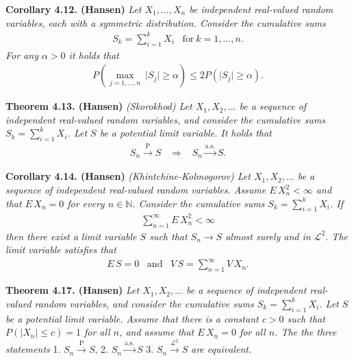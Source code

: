 \documentclass[
]{book}
\begin{document}
\textbf{Corollary 4.12. (Hansen)} \emph{Let \(X_1,...,X_n\) be independent real-valued random variables, each with a symmetric distribution. Consider the cumulative sums}
\begin{align*}
    S_k=\sum_{i=1}^kX_i\hspace{10pt}\text{for}\ k=1,..., n.
\end{align*}
\emph{For any \(\alpha>0\) it holds that}
\begin{align*}
    P\left(\max_{j=1,...,n}\ \vert S_j\vert\ge \alpha\right)\le 2 P(\vert S_j\vert\ge \alpha).\tag{4.14}
\end{align*}

\textbf{Theorem 4.13. (Hansen)} \emph{(Skorokhod) Let \(X_1,X_2,...\) be a sequence of independent real-valued random variables, and consider the cumulative sums \(S_k=\sum_{i=1}^kX_i\). Let \(S\) be a potential limit variable. It holds that}
\begin{align*}
    S_n \stackrel{\text{P}}{\to} S\hspace{10pt}\Rightarrow\hspace{10pt} S_n\stackrel{\text{a.s.}}{\to} S.
\end{align*}

\textbf{Corollary 4.14. (Hansen)} \emph{(Khintchine-Kolmogorov) Let \(X_1,X_2,...\) be a sequence of independent real-valued random variables. Assume \(E\, X_n^2<\infty\) and that \(E\, X_n=0\) for every \(n\in\mathbb{N}\). Consider the cumulative sums \(S_k=\sum_{i=1}^kX_i\). If}
\begin{align*}
    \sum_{n=1}^\infty E\, X_n^2<\infty\tag{4.18}
\end{align*}
\emph{then there exist a limit variable \(S\) such that \(S_n\to S\) almost surely and in \(\mathcal{L}^2\). The limit variable satisfies that}
\begin{align*}
    E\, S=0\hspace{10pt}\text{and}\hspace{10pt}V\, S=\sum_{n=1}^\infty V\, X_n.
\end{align*}

\textbf{Theorem 4.17. (Hansen)} \emph{Let \(X_1,X_2,...\) be a sequence of independent real-valued random variables, and consider the cumulative sums \(S_k=\sum_{i=1}^kX_i\). Let \(S\) be a potential limit variable. Assume that there is a constant \(c>0\) such that \(P(\vert X_n\vert \le c)=1\) for all \(n\), and assume that \(E\, X_n=0\) for all \(n\). The the three statements}
1. \(S_n\stackrel{\text{P}}{\to} S\),
2. \(S_n\stackrel{\text{a.s.}}{\to} S\)
3. \(S_n\stackrel{\mathcal{L}^2}{\to} S\)
\emph{are equivalent.}
\end{document}
